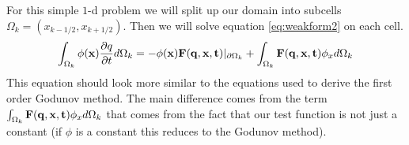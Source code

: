 \documentclass[10]{amsart}
\begin{document}
 For this simple $1$-d problem we will split up our domain into subcells $\Omega_k=(x_{k-1/2},x_{k+1/2})$. Then
 we will solve equation \eqref{eq:weakform2} on each cell.
%  
%  
%  
 \begin{equation}
\int_{\Omega_k} \phi({\bf x}) \frac{\partial q}{\partial t} d\Omega_k =-\phi({\bf x}) {\bf F(q,x,t)} |_{\partial \Omega_k}
 +\int_{\Omega_k}{\bf F(q,x,t)} \phi_x d\Omega_k \label{eq:weakform2}
 \end{equation}
 This equation should look more similar to the equations used to derive the first order Godunov method. The main difference
 comes from the term $\int_{\Omega_k}{\bf F(q,x,t)}\phi_x d\Omega_k$ that comes from the fact that our
 test function is not just a constant (if $\phi$ is a constant this reduces to the Godunov method).
 
\end{document}
